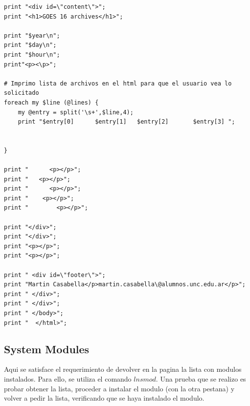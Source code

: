 \documentclass{article}
\begin{document}
\begin{lstlisting}[style=PerlStyle]
print "<div id=\"content\">";
print "<h1>GOES 16 archives</h1>";

print "$year\n";
print "$day\n";
print "$hour\n";
print"<p><\p>";

# Imprimo lista de archivos en el html para que el usuario vea lo solicitado
foreach my $line (@lines) {
    my @entry = split('\s+',$line,4);
    print "$entry[0]      $entry[1]   $entry[2]       $entry[3] ";


}

print "      <p></p>";
print "   <p></p>";
print "      <p></p>";
print "    <p></p>";
print "        <p></p>";

print "</div>";
print "</div>";
print "<p></p>";
print "<p></p>";

print " <div id=\"footer\">";
print "Martin Casabella</p>martin.casabella\@alumnos.unc.edu.ar</p>";
print " </div>";
print " </div>";
print " </body>";
print "  </html>";
\end{lstlisting}


\subsection{System Modules}
Aqui se satisface el requerimiento de devolver en la pagina la lista con modulos instalados. Para ello, se utiliza el comando $lnsmod$.  Una prueba que se realizo es probar obtener la lista, proceder a instalar el 
modulo (con la otra pestana) y volver a pedir la lista, verificando que se haya instalado el modulo. \\
\bigskip
\end{document}
